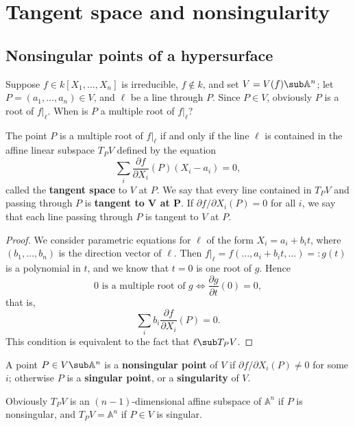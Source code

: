 \section{Tangent space and nonsingularity}
\subsection{Nonsingular points of a hypersurface}
Suppose $f\in k[X_1,\dots,X_n]$ is irreducible, $f\notin k$, and set $V=V(f)\sub\mathbb{A}^n$; let $P=(a_1,\dots,a_n)\in V$, and $\ell$ be a line through $P$. Since $P\in V$, obviously $P$ is a root of $f|_{\ell}$. When is $P$ a multiple root of $f|_{\ell}$?
\begin{proposition}
The point $P$ is a multiple root of $f|_{\ell}$ if and only if the line $\ell$ is contained in the affine linear subspace $T_PV$ defined by the equation
\[\sum_i\frac{\partial f}{\partial X_i}(P)(X_i-a_i)=0,\]
called the \textbf{tangent space} to $V$ at $P$. We say that every line
contained in $T_PV$ and passing through $P$ is \textbf{tangent to $\bm{V}$ at $\bm{P}$}. If $\partial f/\partial X_i(P)=0$ for all $i$, we say that each line passing
through $P$ is tangent to $V$ at $P$.
\end{proposition}
\begin{proof}
We consider parametric equations for $\ell$ of the form $X_i=a_i+b_it$, where $(b_1,\dots,b_n)$ is the direction vector of $\ell$. Then $f|_{\ell}=f(\dots,a_i+b_it,\dots)=:g(t)$ is a polynomial in $t$, and we know that $t=0$ is one root of $g$. Hence
\[\text{$0$ is a multiple root of $g$}\iff\frac{\partial g}{\partial t}(0)=0,\]
that is,
\[\sum_ib_i\frac{\partial f}{\partial X_i}(P)=0.\]
This condition is equivalent to the fact that $\ell\sub T_PV$.
\end{proof}
\begin{definition}
A point $P\in V\sub\mathbb{A}^n$ is a \textbf{nonsingular point} of $V$ if $\partial f/\partial X_i(P)\neq 0$ for some $i$; otherwise $P$ is a \textbf{singular point}, or a \textbf{singularity} of $V$.
\end{definition}
Obviously $T_PV$ is an $(n-1)$-dimensional affine subspace of $\mathbb{A}^n$ if $P$ is nonsingular, and $T_PV=\mathbb{A}^n$ if $P\in V$ is singular.
